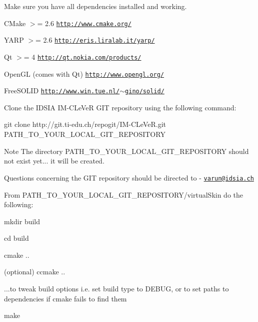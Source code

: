 \begin{DoxyEnumerate}
\item Make sure you have all dependencies installed and working.
\begin{DoxyItemize}
\item CMake $>$= 2.6 \href{http://www.cmake.org/}{\tt http://www.cmake.org/}
\item YARP $>$= 2.6 \href{http://eris.liralab.it/yarp/}{\tt http://eris.liralab.it/yarp/}
\item Qt $>$= 4 \href{http://qt.nokia.com/products/}{\tt http://qt.nokia.com/products/}
\item OpenGL (comes with Qt) \href{http://www.opengl.org/}{\tt http://www.opengl.org/}
\item FreeSOLID \href{http://www.win.tue.nl/~gino/solid/}{\tt http://www.win.tue.nl/$\sim$gino/solid/}
\end{DoxyItemize}
\item Clone the IDSIA IM-\/CLeVeR GIT repository using the following command: \begin{DoxyVerb}git clone http://git.ti-edu.ch/repogit/IM-CLeVeR.git PATH_TO_YOUR_LOCAL_GIT_REPOSITORY \end{DoxyVerb}
 \begin{DoxyNote}{Note}
The directory PATH\_\-TO\_\-YOUR\_\-LOCAL\_\-GIT\_\-REPOSITORY should not exist yet... it will be created. 

Questions concerning the GIT repository should be directed to -\/ \href{mailto:varun@idsia.ch}{\tt varun@idsia.ch}
\end{DoxyNote}

\item From PATH\_\-TO\_\-YOUR\_\-LOCAL\_\-GIT\_\-REPOSITORY/virtualSkin do the following:
\begin{DoxyItemize}
\item \begin{DoxyVerb}mkdir build \end{DoxyVerb}

\item \begin{DoxyVerb}cd build \end{DoxyVerb}

\item \begin{DoxyVerb}cmake .. \end{DoxyVerb}

\item \begin{DoxyVerb}(optional) ccmake .. \end{DoxyVerb}
 ...to tweak build options i.e. set build type to DEBUG, or to set paths to dependencies if cmake fails to find them
\item \begin{DoxyVerb}make \end{DoxyVerb}


\end{DoxyItemize}
\end{DoxyEnumerate}

